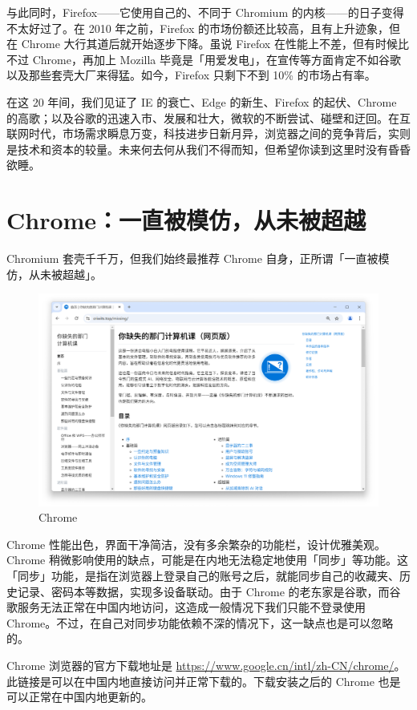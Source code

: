 与此同时，Firefox——它使用自己的、不同于 Chromium 的内核——的日子变得不太好过了。在 2010 年之前，Firefox 的市场份额还比较高，且有上升迹象，但在 Chrome 大行其道后就开始逐步下降。虽说 Firefox 在性能上不差，但有时候比不过 Chrome，再加上 Mozilla 毕竟是「用爱发电」，在宣传等方面肯定不如谷歌以及那些套壳大厂来得猛。如今，Firefox 只剩下不到 10\% 的市场占有率。

在这 20 年间，我们见证了 IE 的衰亡、Edge 的新生、Firefox 的起伏、Chrome 的高歌；以及谷歌的迅速入市、发展和壮大，微软的不断尝试、碰壁和迂回。在互联网时代，市场需求瞬息万变，科技进步日新月异，浏览器之间的竞争背后，实则是技术和资本的较量。未来何去何从我们不得而知，但希望你读到这里时没有昏昏欲睡。

\section{Chrome：一直被模仿，从未被超越}

Chromium 套壳千千万，但我们始终最推荐 Chrome 自身，正所谓「一直被模仿，从未被超越」。

\begin{figure}[htb!]
  \centering
  \includegraphics[width=.7\textwidth]{assets/software/Missing_homepage_in_Chrome.png}
  \caption{Chrome}
  \label{fig:Missing_homepage_in_Chrome}
\end{figure}

Chrome 性能出色，界面干净简洁，没有多余繁杂的功能栏，设计优雅美观。Chrome 稍微影响使用的缺点，可能是在内地无法稳定地使用「同步」等功能。这「同步」功能，是指在浏览器上登录自己的账号之后，就能同步自己的收藏夹、历史记录、密码本等数据，实现多设备联动。由于 Chrome 的老东家是谷歌，而谷歌服务无法正常在中国内地访问，这造成一般情况下我们只能不登录使用 Chrome。不过，在自己对同步功能依赖不深的情况下，这一缺点也是可以忽略的。

Chrome 浏览器的官方下载地址是 \url{https://www.google.cn/intl/zh-CN/chrome/}。此链接是可以在中国内地直接访问并正常下载的。下载安装之后的 Chrome 也是可以正常在中国内地更新的。

